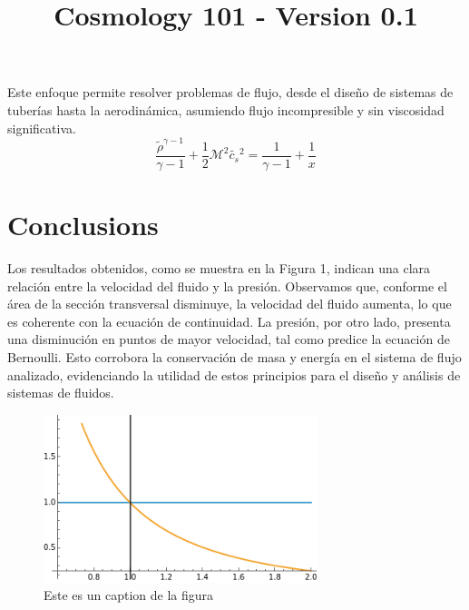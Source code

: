 \documentclass{article}\usepackage{graphicx} \usepackage{amsmath} \usepackage{colortbl}\title{Cosmology 101 - Version 0.1}
\begin{document}
Este enfoque permite resolver problemas de flujo, desde el diseño de sistemas de tuberías hasta la aerodinámica, asumiendo flujo incompresible y sin viscosidad significativa.\begin{equation}\frac{\tilde{\rho }^{\gamma -1}}{\gamma -1}+\frac{1}{2} \mathcal{M}^2 \tilde{c_s}{}^2=\frac{1}{\gamma -1}+\frac{1}{x}\label{ber2}\end{equation}\section{Conclusions}
Los resultados obtenidos, como se muestra en la Figura 1, indican una clara relación entre la velocidad del fluido y la presión. Observamos que, conforme el área de la sección transversal disminuye, la velocidad del fluido aumenta, lo que es coherente con la ecuación de continuidad. La presión, por otro lado, presenta una disminución en puntos de mayor velocidad, tal como predice la ecuación de Bernoulli. Esto corrobora la conservación de masa y energía en el sistema de flujo analizado, evidenciando la utilidad de estos principios para el diseño y análisis de sistemas de fluidos.\begin{figure}\includegraphics[width=8.0cm]{images/imagen1.png}\caption{Este es un caption de la figura}\label{pl1}\end{figure}
\end{document}
